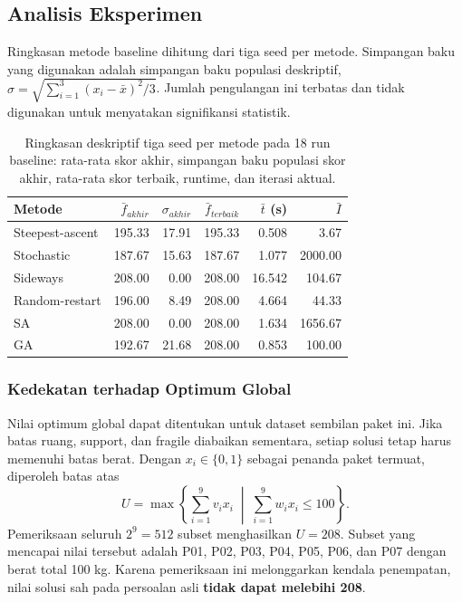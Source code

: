 \documentclass[12pt,a4paper]{article}
\begin{document}
\subsection{Analisis Eksperimen}

Ringkasan metode baseline dihitung dari tiga seed per metode. Simpangan baku yang digunakan adalah simpangan baku populasi deskriptif, $\sigma=\sqrt{\sum_{i=1}^{3}(x_i-\bar{x})^2/3}$. Jumlah pengulangan ini terbatas dan tidak digunakan untuk menyatakan signifikansi statistik.
\begin{table}[htbp]
\centering
\small
\setlength{\tabcolsep}{4pt}
\begin{tabular}{@{}l r r r r r@{}}
\toprule
Metode & $\bar f_{akhir}$ & $\sigma_{akhir}$ & $\bar f_{terbaik}$ & $\bar t$ (s) & $\bar I$ \\
\midrule
Steepest-ascent & 195.33 & 17.91 & 195.33 & 0.508 & 3.67 \\
Stochastic & 187.67 & 15.63 & 187.67 & 1.077 & 2000.00 \\
Sideways & 208.00 & 0.00 & 208.00 & 16.542 & 104.67 \\
Random-restart & 196.00 & 8.49 & 208.00 & 4.664 & 44.33 \\
SA & 208.00 & 0.00 & 208.00 & 1.634 & 1656.67 \\
GA & 192.67 & 21.68 & 208.00 & 0.853 & 100.00 \\
\bottomrule
\end{tabular}
\caption{Ringkasan deskriptif tiga seed per metode pada 18 run baseline: rata-rata skor akhir, simpangan baku populasi skor akhir, rata-rata skor terbaik, runtime, dan iterasi aktual.}
\label{tab:ringkasan-manual}
\end{table}

\subsubsection{Kedekatan terhadap Optimum Global}
\label{sec:optimum-eksperimen}
Nilai optimum global dapat ditentukan untuk dataset sembilan paket ini. Jika batas ruang, support, dan fragile diabaikan sementara, setiap solusi tetap harus memenuhi batas berat. Dengan $x_i\in\{0,1\}$ sebagai penanda paket termuat, diperoleh batas atas
\[
 U=\max\left\{\sum_{i=1}^{9}v_i x_i\;\middle|\;\sum_{i=1}^{9}w_i x_i\leq100\right\}.
\]
Pemeriksaan seluruh $2^9=512$ subset menghasilkan $U=208$. Subset yang mencapai nilai tersebut adalah P01, P02, P03, P04, P05, P06, dan P07 dengan berat total 100 kg. Karena pemeriksaan ini melonggarkan kendala penempatan, nilai solusi sah pada persoalan asli \textbf{tidak dapat melebihi 208}.
\end{document}

